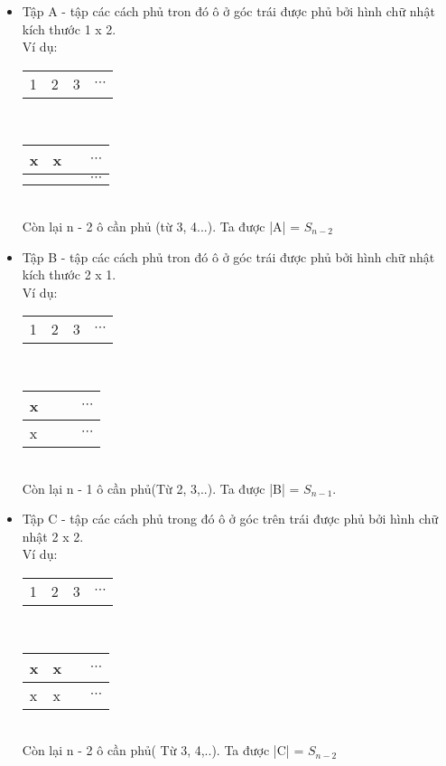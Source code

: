 \documentclass[12pt,oneside]{book}
\begin{document}
\begin{itemize}
	\item Tập A - tập các cách phủ tron đó ô ở góc trái được phủ bởi hình chữ nhật kích thước 1 x 2.\\
	Ví dụ:
	\begin{table}[h!]
		\centering
		\begin{tabular}{p{0.5cm}p{0.5cm}p{0.5cm}p{0.5cm}}
			1&2&3& $\cdots$ 
		\end{tabular}
		\\
		\begin{tabular}{|p{0.5cm}|p{0.5cm}|p{0.5cm}|p{0.5cm}}
			\hline
			x&x&& $\cdots$  \\
			\hline
			&&& $\cdots$\\
			\hline
		\end{tabular}
	\end{table}
	\\Còn lại n - 2 ô cần phủ (từ 3, 4...). Ta được |A| = $S_{n-2}$
	\item Tập B - tập các cách phủ tron đó ô ở góc trái được phủ bởi hình chữ nhật kích thước 2 x 1.\\
	Ví dụ:
	\begin{table}[h!]
		\centering
		\begin{tabular}{p{0.5cm}p{0.5cm}p{0.5cm}p{0.5cm}}
			1&2&3& $\cdots$ 
		\end{tabular}
		\\
		\begin{tabular}{|p{0.5cm}|p{0.5cm}|p{0.5cm}|p{0.5cm}}
			\hline
			x&&& $\cdots$  \\
			\hline
			x&&& $\cdots$\\
			\hline
		\end{tabular}
	\end{table}
	\\ Còn lại n - 1  ô cần phủ(Từ 2, 3,..). Ta được |B| = $S_{n-1}$. 
	\item Tập C - tập các cách phủ trong đó ô ở góc trên trái được phủ bởi hình chữ  nhật 2 x 2.\\
	Ví dụ:\\
	\begin{table}[h!]
		\centering
		\begin{tabular}{p{0.5cm}p{0.5cm}p{0.5cm}p{0.5cm}}
			1&2&3& $\cdots$ 
		\end{tabular}
		\\
		\begin{tabular}{|p{0.5cm}|p{0.5cm}|p{0.5cm}|p{0.5cm}}
			\hline
			x&x&& $\cdots$  \\
			\hline
			x&x&& $\cdots$\\
			\hline
		\end{tabular}
	\end{table}
	\\ Còn lại n - 2 ô cần phủ(  Từ 3, 4,..). Ta được |C| = $S_{n-2}$    
\end{itemize}
\end{document}

